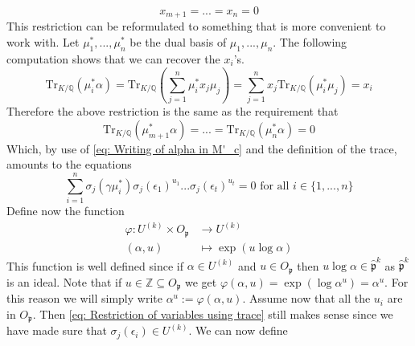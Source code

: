 \documentclass{article}
\newcommand{\mfrak}[1]{\mathfrak{#1}}
\newcommand{\mbb}[1]{\mathbb{#1}}
\newcommand{\tr}{\text{Tr}}
\begin{document}
\begin{equation}\label{eq: Restriction of variables}
    x_{m+1} = ... = x_n = 0
\end{equation}
This restriction can be reformulated to something that is more convenient to work with. Let $\mu_1^*, ..., \mu_n^*$ be the dual basis of $\mu_1, ..., \mu_n$. The following computation shows that we can recover the $x_i$'s. 
$$\tr_{K/\mbb Q}(\mu_i^* \alpha) = \tr_{K/\mbb Q} (\sum_{j=1}^n \mu_i^* x_j \mu_j) = \sum_{j=1}^n x_j \tr_{K/\mbb Q}(\mu_i^* \mu_j) = x_i$$ 
Therefore the above restriction is the same as the requirement that
$$\tr_{K/\mbb Q}(\mu_{m+1}^* \alpha) = ... = \tr_{K/\mbb Q}(\mu_n^* \alpha) = 0$$
Which, by use of \cref{eq: Writing of alpha in M'_c} and the definition of the trace, amounts to the equations
\begin{equation}\label{eq: Restriction of variables using trace}
    \sum_{i = 1}^n \sigma_j(\gamma \mu_i^* ) \sigma_j(\epsilon_1)^{u_1}...\sigma_j(\epsilon_t)^{u_t} = 0 \text{ for all } i \in \{1, ..., n\} 
\end{equation}
Define now the function
\begin{equation*}\label{eq: Exponential function}
    \begin{split}
        \varphi : U^{(k)} \times O_\mfrak p &\to U^{(k)} \\
        (\alpha, u) &\mapsto \exp(u \log \alpha)
    \end{split}
\end{equation*}
This function is well defined since if $\alpha \in U^{(k)}$ and $u \in O_\mfrak p$ then $u \log \alpha \in \hat {\mfrak p}^k$ as $\hat {\mfrak p}^k$ is an ideal. Note that if $u \in \mbb Z \subseteq O_\mfrak p$ we get $\varphi(\alpha, u) = \exp(\log \alpha^u) = \alpha^u$. For this reason we will simply write $\alpha^u := \varphi(\alpha, u)$. Assume now that all the $u_i$ are in $O_\mfrak p$. Then \cref{eq: Restriction of variables using trace} still makes sense since we have made sure that $\sigma_j(\epsilon_i) \in U^{(k)}$. We can now define
\end{document}
